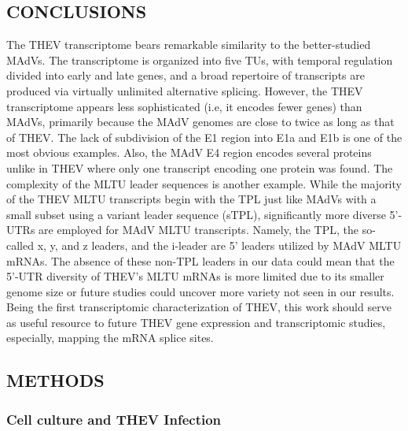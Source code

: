 \documentclass[
]{article}
\begin{document}
\subsection{CONCLUSIONS}\label{conclusions}

The THEV transcriptome bears remarkable similarity to the better-studied
MAdVs. The transcriptome is organized into five TUs, with temporal
regulation divided into early and late genes, and a broad repertoire of
transcripts are produced via virtually unlimited alternative splicing.
However, the THEV transcriptome appears less sophisticated (i.e, it
encodes fewer genes) than MAdVs, primarily because the MAdV genomes are
close to twice as long as that of THEV. The lack of subdivision of the
E1 region into E1a and E1b is one of the most obvious examples. Also,
the MAdV E4 region encodes several proteins unlike in THEV where only
one transcript encoding one protein was found. The complexity of the
MLTU leader sequences is another example. While the majority of the THEV
MLTU transcripts begin with the TPL just like MAdVs with a small subset
using a variant leader sequence (sTPL), significantly more diverse
5'-UTRs are employed for MAdV MLTU transcripts. Namely, the TPL, the
so-called x, y, and z leaders, and the i-leader are 5' leaders utilized
by MAdV MLTU mRNAs. The absence of these non-TPL leaders in our data
could mean that the 5'-UTR diversity of THEV's MLTU mRNAs is more
limited due to its smaller genome size or future studies could uncover
more variety not seen in our results. Being the first transcriptomic
characterization of THEV, this work should serve as useful resource to
future THEV gene expression and transcriptomic studies, especially,
mapping the mRNA splice sites. \newpage

\subsection{METHODS}\label{methods}

\subsubsection{Cell culture and THEV
Infection}\label{cell-culture-and-thev-infection}
\end{document}

